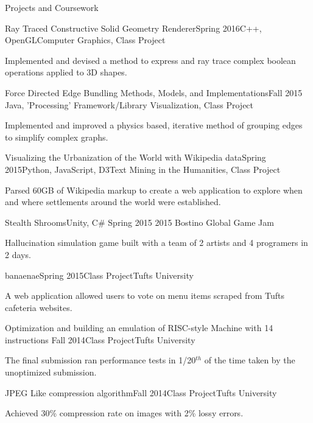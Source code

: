 \documentclass{resume}
\begin{document}
  \begin{rSection}{Projects and Coursework}
    \begin{rSubsection}{Ray Traced Constructive Solid Geometry Renderer}{Spring 2016}{C++, OpenGL}{Computer Graphics, Class Project}
    \item Implemented and devised a method to express and ray trace complex boolean operations applied to 3D shapes.
    \end{rSubsection}
    \begin{rSubsection}{Force Directed Edge Bundling Methods, Models, and Implementations}{Fall 2015}
    {Java, 'Processing' Framework/Library} {Visualization, Class Project}
    \item Implemented and improved a physics based, iterative method of grouping edges to simplify complex graphs.
    \end{rSubsection}
    \begin{rSubsection}{Visualizing the Urbanization of the World with Wikipedia data}{Spring 2015}{Python, JavaScript, D3}{Text Mining in the Humanities, Class Project}
    \item Parsed 60GB of Wikipedia markup to create a web application to explore when and where settlements around the world were established.
    \end{rSubsection}
    \begin{rSubsection}{Stealth Shrooms}{Unity, C\#} {Spring 2015} {2015 Bostino Global Game Jam}
    \item Hallucination simulation game built with a team of 2 artists and 4 programers in 2 days.
    \end{rSubsection}
    \begin{rSubsection}{banaenae}{Spring 2015}{Class Project}{Tufts University}
    \item A web application allowed users to vote on menu items scraped from Tufts cafeteria websites.
    \end{rSubsection}
    \begin{rSubsection}{Optimization and building an emulation of RISC-style Machine with 14 instructions }{Fall 2014}{Class Project}{Tufts University}
    \item The final submission ran performance tests in 1/20$^{th}$ of the time taken by the unoptimized submission.
    \end{rSubsection}
    \begin{rSubsection}{JPEG Like compression algorithm}{Fall 2014}{Class Project}{Tufts University}
    \item Achieved 30\% compression rate on images with 2\% lossy errors.
    \end{rSubsection}
  
  \end{rSection}
  
\end{document}
